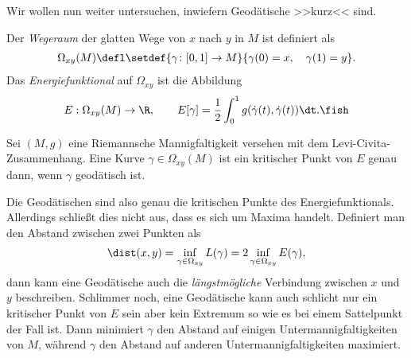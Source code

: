 \documentclass[%
	paper=a5,%
	fleqn,%
	DIV=18,%
	BCOR=0mm,
	fontsize=11pt,
	titlepage=false,%
	bibliography=totoc,
	DIV=18,%
	twoside=true,
	pdftitle=Riemannsche Geometrie,
	pdfauthor=Uwe Semmelmann,
	numbers=noendperiod]%
	{scrbook}
\begin{document}
Wir wollen nun weiter untersuchen, inwiefern Geodätische >>kurz<< sind.

\begin{defn}
Der \emph{Wegeraum} der glatten Wege von $x$ nach $y$ in $M$ ist definiert als
\begin{align*}
\Omega_{xy}(M) \defl \setdef{\gamma\colon[0,1]\to M}{\gamma(0)=x,\quad \gamma(1)=y}.
\end{align*} 
Das \emph{Energiefunktional} auf $\Omega_{xy}$ ist die Abbildung
\begin{align*}
E: \Omega_{xy}(M) \to \R,\qquad
E[\gamma] = \frac{1}{2} \int_0^1 g(\dot{\gamma}(t),\dot{\gamma}(t))\dt.\fish
\end{align*}
\end{defn}

\begin{prop}
Sei $(M,g)$ eine Riemannsche Mannigfaltigkeit versehen mit dem Levi-Civita-Zusammenhang.
Eine Kurve $\gamma\in \Omega_{xy}(M)$ ist ein kritischer Punkt von $E$ genau
dann, wenn $\gamma$ geodätisch ist.\fish
\end{prop}


Die Geodätischen sind also genau die kritischen Punkte des
Energiefunktionals. Allerdings schließt dies nicht aus, dass es sich um Maxima
handelt. Definiert man den Abstand zwischen zwei Punkten als
\begin{align*}
\dist(x,y) = \inf_{\gamma\in \Omega_{xy}} L(\gamma) = 2 \inf_{\gamma\in
\Omega_{xy}} E(\gamma),
\end{align*}
dann kann eine Geodätische auch die \textit{längstmögliche} Verbindung zwischen
$x$ und $y$ beschreiben. Schlimmer noch, eine Geodätische kann auch schlicht nur
ein kritischer Punkt von $E$ sein aber kein Extremum so wie es bei einem
Sattelpunkt der Fall ist. Dann minimiert $\gamma$ den Abstand auf einigen
Untermannigfaltigkeiten von $M$, während $\gamma$ den Abstand auf anderen
Untermannigfaltigkeiten maximiert.
\end{document}
